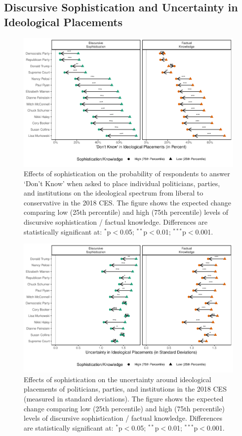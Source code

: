 \documentclass[12pt]{article}
\begin{document}
\clearpage
\subsection{Discursive Sophistication and Uncertainty in Ideological Placements}\label{app:placement}

\begin{figure}[h]\centering
	\includegraphics{../out/appC4-placements_dk.pdf}
	\caption{Effects of sophistication on the probability of respondents to answer `Don't Know' when asked to place individual politicians, parties, and institutions on the ideological spectrum from liberal to conservative in the 2018 CES. The figure shows the expected change comparing low (25th percentile) and high (75th percentile) levels of discursive sophistication / factual knowledge. Differences are statistically significant at: $^{*}$p$<$0.05; $^{**}$p$<$0.01; $^{***}$p$<$0.001.}\label{fig:placements_dk}
\end{figure}

\begin{figure}[h]\centering
	\includegraphics{../out/appC5-placements.pdf}
	\caption{Effects of sophistication on the uncertainty around ideological placements of  politicians, parties, and institutions in the 2018 CES (measured in standard deviations). The figure shows the expected change comparing low (25th percentile) and high (75th percentile) levels of discursive sophistication / factual knowledge. Differences are statistically significant at: $^{*}$p$<$0.05; $^{**}$p$<$0.01; $^{***}$p$<$0.001.}\label{fig:placements}
\end{figure}
\end{document}
